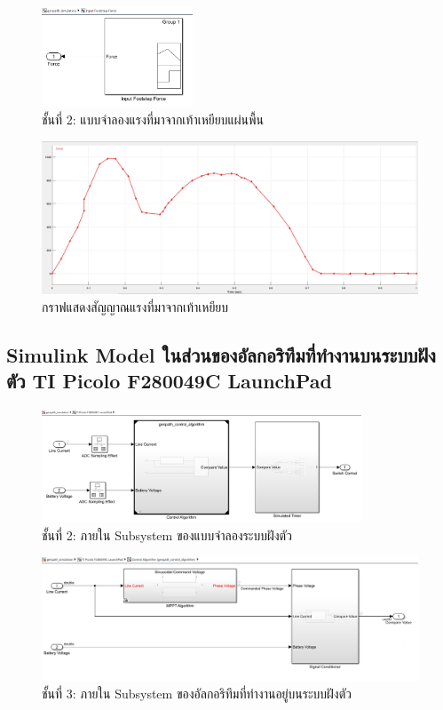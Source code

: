 \documentclass[11pt,a4paper]{article}
\begin{document}
\begin{figure}[H]
    \centering
    \includegraphics[width=0.4\textwidth]{l2-footstep-force.png}
    \caption{ชั้นที่ 2: แบบจำลองแรงที่มาจากเท้าเหยียบแผ่นพื้น}
\end{figure}

\begin{figure}[H]
    \centering
    \includegraphics[width=\textwidth]{footstepsignal.png}
    \caption{กราฟแสดงสัญญาณแรงที่มาจากเท้าเหยียบ}
\end{figure}

\subsection{Simulink Model ในส่วนของอัลกอริทึมที่ทำงานบนระบบฝังตัว TI Picolo F280049C LaunchPad}

\begin{figure}[H]
    \centering
    \includegraphics[width=0.85\textwidth]{l2-embed.png}
    \caption{ชั้นที่ 2: ภายใน Subsystem ของแบบจำลองระบบฝังตัว}
\end{figure}

\begin{figure}[H]
    \centering
    \includegraphics[width=\textwidth]{l3-control-algo.png}
    \caption{ชั้นที่ 3: ภายใน Subsystem ของอัลกอริทึมที่ทำงานอยู่บนระบบฝังตัว}
\end{figure}
\end{document}
